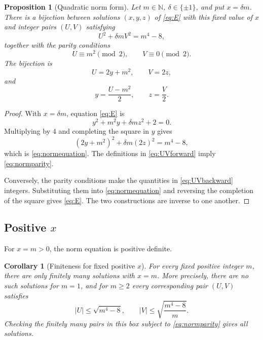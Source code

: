 \documentclass[11pt,a4paper]{amsart}
\numberwithin{equation}{section}
\newtheorem{proposition}[theorem]{Proposition}
\newtheorem{corollary}[theorem]{Corollary}
\theoremstyle{definition}
\newcommand{\N}{\mathbb N}
\begin{document}
\begin{proposition}[Quadratic norm form]\label{prop:normform}
Let \(m\in\N\), \(\delta\in\{\pm1\}\), and put \(x=\delta m\).
There is a bijection between solutions \((x,y,z)\) of \eqref{eq:E}
with this fixed value of \(x\) and integer pairs \((U,V)\) satisfying
\begin{equation}
 U^2+\delta mV^2=m^4-8,
 \label{eq:normequation}
\end{equation}
together with the parity conditions
\begin{equation}
 U\equiv m^2\pmod2,
 \qquad V\equiv0\pmod2.
 \label{eq:normparity}
\end{equation}
The bijection is
\begin{equation}
 U=2y+m^2,
 \qquad V=2z,
 \label{eq:UVforward}
\end{equation}
and
\begin{equation}
 y=\frac{U-m^2}{2},
 \qquad z=\frac V2.
 \label{eq:UVbackward}
\end{equation}
\end{proposition}

\begin{proof}
With \(x=\delta m\), equation \eqref{eq:E} is
\begin{equation*}
 y^2+m^2y+\delta mz^2+2=0.
\end{equation*}
Multiplying by \(4\) and completing the square in \(y\) gives
\begin{equation*}
 (2y+m^2)^2+\delta m(2z)^2=m^4-8,
\end{equation*}
which is \eqref{eq:normequation}.  The definitions in
\eqref{eq:UVforward} imply \eqref{eq:normparity}.

Conversely, the parity conditions make the quantities in
\eqref{eq:UVbackward} integers.  Substituting them into
\eqref{eq:normequation} and reversing the completion of the square
gives \eqref{eq:E}.  The two constructions are inverse to one another.
\end{proof}

\subsection{Positive \texorpdfstring{\(x\)}{x}}

For \(x=m>0\), the norm equation is positive definite.

\begin{corollary}[Finiteness for fixed positive \(x\)]\label{cor:positivefinite}
For every fixed positive integer \(m\), there are only finitely many
solutions with \(x=m\).  More precisely, there are no such solutions
for \(m=1\), and for \(m\ge2\) every corresponding pair \((U,V)\)
satisfies
\begin{equation}
 |U|\le\sqrt{m^4-8},
 \qquad
 |V|\le\sqrt{\frac{m^4-8}{m}}.
 \label{eq:positivebounds}
\end{equation}
Checking the finitely many pairs in this box subject to
\eqref{eq:normparity} gives all solutions.
\end{corollary}
\end{document}
